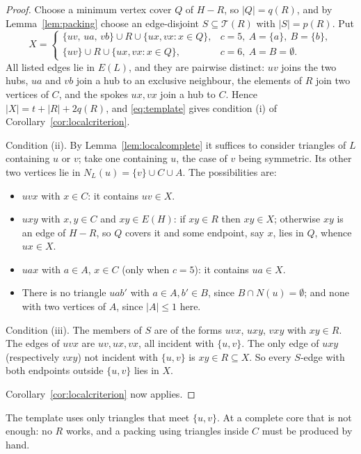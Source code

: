 \documentclass[11pt,a4paper]{amsart}
\theoremstyle{plain}
\theoremstyle{definition}
\newcommand{\N}{N}
\begin{document}
\begin{proof}
Choose a minimum vertex cover $Q$ of $H-R$, so $|Q|=q(R)$, and by
Lemma~\ref{lem:packing} choose an edge-disjoint $S\subseteq\mathcal{T}(R)$
with $|S|=p(R)$. Put
\[
  X=\begin{cases}
    \{uv,\,ua,\,vb\}\cup R\cup\{ux,vx : x\in Q\}, & c=5,\ A=\{a\},\ B=\{b\},\\[2pt]
    \{uv\}\cup R\cup\{ux,vx : x\in Q\}, & c=6,\ A=B=\emptyset.
  \end{cases}
\]
All listed edges lie in $E(L)$, and they are pairwise distinct: $uv$ joins the
two hubs, $ua$ and $vb$ join a hub to an exclusive neighbour, the elements of
$R$ join two vertices of $C$, and the spokes $ux,vx$ join a hub to $C$. Hence
$|X|=t+|R|+2q(R)$, and \eqref{eq:template} gives condition (i) of
Corollary~\ref{cor:localcriterion}.

Condition (ii). By Lemma~\ref{lem:localcomplete} it suffices to consider
triangles of $L$ containing $u$ or $v$; take one containing $u$, the case of
$v$ being symmetric. Its other two vertices lie in
$\N_L(u)=\{v\}\cup C\cup A$. The possibilities are:
\begin{itemize}
  \item $uvx$ with $x\in C$: it contains $uv\in X$.
  \item $uxy$ with $x,y\in C$ and $xy\in E(H)$: if $xy\in R$ then $xy\in X$;
    otherwise $xy$ is an edge of $H-R$, so $Q$ covers it and some endpoint,
    say $x$, lies in $Q$, whence $ux\in X$.
  \item $uax$ with $a\in A$, $x\in C$ (only when $c=5$): it contains
    $ua\in X$.
  \item There is no triangle $uab'$ with $a\in A,b'\in B$, since
    $B\cap \N(u)=\emptyset$; and none with two vertices of $A$, since
    $|A|\le1$ here.
\end{itemize}
Condition (iii). The members of $S$ are of the forms $uvx$, $uxy$, $vxy$ with
$xy\in R$. The edges of $uvx$ are $uv,ux,vx$, all incident with $\{u,v\}$. The
only edge of $uxy$ (respectively $vxy$) not incident with $\{u,v\}$ is
$xy\in R\subseteq X$. So every $S$-edge with both endpoints outside $\{u,v\}$
lies in $X$.

Corollary~\ref{cor:localcriterion} now applies.
\end{proof}

The template uses only triangles that meet $\{u,v\}$. At a complete core that
is not enough: no $R$ works, and a packing using triangles inside $C$ must be
produced by hand.
\end{document}
